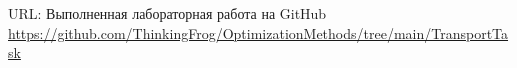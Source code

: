 \documentclass[../body.tex]{subfiles}
\begin{document}
URL: Выполненная лабораторная работа на GitHub \\ \url{https://github.com/ThinkingFrog/OptimizationMethods/tree/main/TransportTask}
\end{document}
